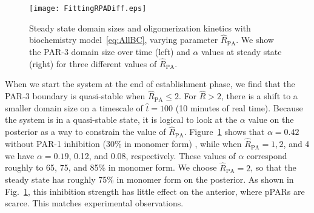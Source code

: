\documentclass[11pt]{article}
\newcommand{\red}[1]{\color{red}#1\normalcolor}
\newcommand{\6}[1]{#1_{\text{6}}}
\newcommand{\3}[1]{#1_{\text{3}}}
\begin{document}
\begin{figure}
\centering
\texttt{[image: FittingRPADiff.eps]}
\caption{\label{fig:BCSS}Steady state domain sizes and oligomerization kinetics with biochemistry model\ \eqref{eq:AllBC}, varying parameter $\hat R_\text{PA}$. We show the PAR-3 domain size over time (left) and $\alpha$ values at steady state (right) for three different values of $\hat R_\text{PA}$. }
\end{figure}

When we start the system at the end of establishment phase, we find that the PAR-3 boundary is quasi-stable when $\hat R_\text{PA} \leq 2$. For $\hat R > 2$, there is a shift to a smaller domain size on a timescale of $\hat t = 100$ (10 minutes of real time). Because the system is in a quasi-stable state, it is logical to look at the $\alpha$ value on the posterior as a way to constrain the value of $\hat R_\text{PA}$. Figure\ \ref{fig:BCSS} shows that $\alpha=0.42$ without PAR-1 inhibition (30\% in monomer form) \cite{lang2023oligomerization}, while when $\hat R_\text{PA}=1,2$, and 4 we have $\alpha=0.19$, 0.12, and 0.08, respectively. These values of $\alpha$ correspond roughly to 65, 75, and 85\% in monomer form. \red{We choose $\hat R_\text{PA}=2$, so that the steady state has roughly 75\% in monomer form on the posterior. As shown in Fig.\ \ref{fig:BCSS}, this inhibition strength has little effect on the anterior, where pPARs are scarce. This matches experimental observations.}
\end{document}
